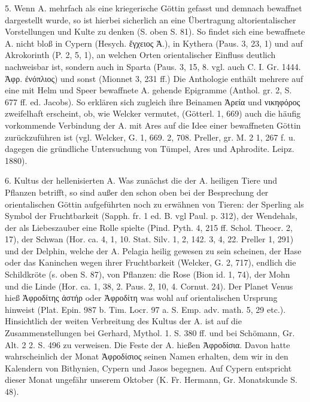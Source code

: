 \documentclass[a4paper, 11pt, oneside]{article}
\begin{document}
5. Wenn A. mehrfach als eine kriegerische Göttin gefasst und demnach bewaffnet dargestellt wurde, so ist hierbei sicherlich an eine Übertragung altorientalischer Vorstellungen und Kulte zu denken (S. oben S. 81). So findet sich eine bewaffnete A. nicht bloß in Cypern (Hesych. ἔγχειος Ἀ.), in Kythera (Paus. 3, 23, 1) und auf Akrokorinth (P. 2, 5, 1), an welchen Orten orientalischer Einfluss deutlich nachweisbar ist, sondern auch in Sparta (Paus. 3, 15, 8. vgl. auch C. I. Gr. 1444. Ἀφρ. ἐνόπλιος) und sonst (Mionnet 3, 231 ff.) Die Anthologie enthält mehrere auf eine mit Helm und Speer bewaffnete A. gehende Epigramme (Anthol. gr. 2, S. 677 ff. ed. Jacobs). So erklären sich zugleich ihre Beinamen Ἀρεία und νικηφόρος zweifelhaft erscheint, ob, wie Welcker vermutet, (Götterl. 1, 669) auch die häufig vorkommende Verbindung der A. mit Ares auf die Idee einer bewaffneten Göttin zurückzuführen ist (vgl. Welcker, G. 1, 669. 2, 708. Preller, gr. M. 2 1, 267 f. u. dagegen die gründliche Untersuchung von Tümpel, Ares und Aphrodite. Leipz. 1880).

6. Kultus der hellenisierten A. Was zunächst die der A. heiligen Tiere und Pflanzen betrifft, so sind außer den schon oben bei der Besprechung der orientalischen Göttin aufgeführten noch zu erwähnen von Tieren: der Sperling als Symbol der Fruchtbarkeit (Sapph. fr. 1 ed. B. vgl Paul. p. 312), der Wendehals, der als Liebeszauber eine Rolle spielte (Pind. Pyth. 4, 215 ff. Schol. Theocr. 2, 17), der Schwan (Hor. ca. 4, 1, 10. Stat. Silv. 1, 2, 142. 3, 4, 22. Preller 1, 291) und der Delphin, welche der A. Pelagia heilig gewesen zu sein scheinen, der Hase oder das Kaninchen wegen ihrer Fruchtbarkeit (Welcker, G. 2, 717), endlich die Schildkröte (s. oben S. 87), von Pflanzen: die Rose (Bion id. 1, 74), der Mohn und die Linde (Hor. ca. 1, 38, 2. Paus. 2, 10, 4. Cornut. 24). Der Planet Venus hieß Ἀφροδίτης ἀστήρ oder Ἀφροδίτη was wohl auf orientalischen Ursprung hinweist (Plat. Epin. 987 b. Tim. Locr. 97 a. S. Emp. adv. math. 5, 29 etc.). Hinsichtlich der weiten Verbreitung des Kultus der A. ist auf die Zusammenstellungen bei Gerhard, Mythol. 1. S. 380 ff. und bei Schömann, Gr. Alt. 2 2. S. 496 zu verweisen. Die Feste der A. hießen Ἀφροδίσια. Davon hatte wahrscheinlich der Monat Ἀφροδίσιος seinen Namen erhalten, dem wir in den Kalendern von Bithynien, Cypern und Jasos begegnen. Auf Cypern entspricht dieser Monat ungefähr unserem Oktober (K. Fr. Hermann, Gr. Monatskunde S. 48).
\end{document}
